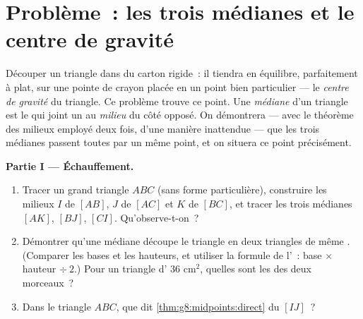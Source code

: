 \section{Problème~: les trois médianes et le centre de gravité}

\begin{problem}
\label{pb:g8:midpoints:1}
Découper un triangle dans du carton rigide~: il tiendra en
équilibre, parfaitement à plat, sur une pointe de crayon placée en un
point bien particulier --- le \emph{centre de gravité} du triangle. Ce problème trouve ce point. Une
\emph{médiane} d'un triangle est le  qui joint
un  au \emph{milieu} du côté opposé. On démontrera --- avec le
théorème des milieux employé deux fois, d'une manière inattendue ---
que les trois médianes passent toutes par un même point, et on
situera ce point précisément.

\medskip
\noindent\textbf{Partie I --- Échauffement.}
\begin{enumerate}
  \item Tracer un grand triangle $ABC$ (sans forme particulière),
        construire les milieux $I$ de $[AB]$, $J$ de $[AC]$ et $K$
        de $[BC]$, et tracer les trois médianes $[AK]$, $[BJ]$,
        $[CI]$. Qu'observe-t-on~?
  \item Démontrer qu'une médiane découpe le triangle en deux
        triangles de même . (Comparer les bases et les hauteurs,
        et utiliser la formule de l'~: base $\times$ hauteur
        $\div\ 2$.) Pour un triangle d' $36$ cm$^2$, quelles
        sont les  des deux morceaux~?
  \item Dans le triangle $ABC$, que dit
        \cref{thm:g8:midpoints:direct} du  $[IJ]$~?
\end{enumerate}


\end{problem}
